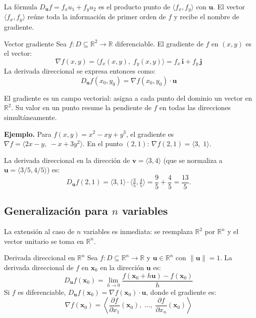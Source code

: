 La fórmula $D_{\mathbf{u}} f = f_x u_1 + f_y u_2$ es el producto punto de $\langle f_x, f_y \rangle$ con $\mathbf{u}$. El vector $\langle f_x, f_y \rangle$ reúne toda la información de primer orden de $f$ y recibe el nombre de gradiente.

\begin{mydefinition}{Vector gradiente}
Sea $f: D \subseteq \mathbb{R}^2 \to \mathbb{R}$ diferenciable. El gradiente de $f$ en $(x, y)$ es el vector:
\[
\nabla f(x, y) = \langle f_x(x, y),\; f_y(x, y) \rangle = f_x\,\mathbf{i} + f_y\,\mathbf{j}
\]
La derivada direccional se expresa entonces como:
\[
D_{\mathbf{u}} f(x_0, y_0) = \nabla f(x_0, y_0) \cdot \mathbf{u}
\]
\end{mydefinition}

El gradiente es un campo vectorial: asigna a cada punto del dominio un vector en $\mathbb{R}^2$. Su valor en un punto resume la pendiente de $f$ en todas las direcciones simultáneamente.

\textbf{Ejemplo.} Para $f(x, y) = x^2 - xy + y^3$, el gradiente es $\nabla f = \langle 2x - y,\; -x + 3y^2 \rangle$. En el punto $(2, 1)$: $\nabla f(2,1) = \langle 3,\; 1 \rangle$.

La derivada direccional en la dirección de $\mathbf{v} = \langle 3, 4 \rangle$ (que se normaliza a $\mathbf{u} = \langle 3/5, 4/5 \rangle$) es:
\[
D_{\mathbf{u}} f(2,1) = \langle 3, 1 \rangle \cdot \langle \tfrac{3}{5}, \tfrac{4}{5} \rangle = \frac{9}{5} + \frac{4}{5} = \frac{13}{5}.
\]

\subsection{Generalización para $n$ variables}

La extensión al caso de $n$ variables es inmediata: se reemplaza $\mathbb{R}^2$ por $\mathbb{R}^n$ y el vector unitario se toma en $\mathbb{R}^n$.

\begin{mydefinition}{Derivada direccional en $\mathbb{R}^n$}
Sea $f: D \subseteq \mathbb{R}^n \to \mathbb{R}$ y $\mathbf{u} \in \mathbb{R}^n$ con $\|\mathbf{u}\| = 1$. La derivada direccional de $f$ en $\mathbf{x}_0$ en la dirección $\mathbf{u}$ es:
\[
D_{\mathbf{u}} f(\mathbf{x}_0) = \lim_{h \to 0} \frac{f(\mathbf{x}_0 + h\mathbf{u}) - f(\mathbf{x}_0)}{h}
\]
Si $f$ es diferenciable, $D_{\mathbf{u}} f(\mathbf{x}_0) = \nabla f(\mathbf{x}_0) \cdot \mathbf{u}$, donde el gradiente es:
\[
\nabla f(\mathbf{x}_0) = \left\langle \frac{\partial f}{\partial x_1}(\mathbf{x}_0),\; \dots,\; \frac{\partial f}{\partial x_n}(\mathbf{x}_0) \right\rangle
\]
\end{mydefinition}

